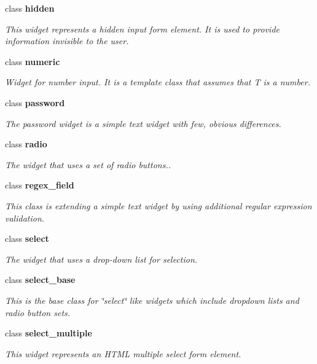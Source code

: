 \begin{DoxyCompactItemize}
class {\bf hidden}
\begin{DoxyCompactList}\small\item\em This widget represents a hidden input form element. It is used to provide information invisible to the user. \end{DoxyCompactList}\item 
class {\bf numeric}
\begin{DoxyCompactList}\small\item\em Widget for number input. It is a template class that assumes that T is a number. \end{DoxyCompactList}\item 
class {\bf password}
\begin{DoxyCompactList}\small\item\em The password widget is a simple text widget with few, obvious differences. \end{DoxyCompactList}\item 
class {\bf radio}
\begin{DoxyCompactList}\small\item\em The widget that uses a set of radio buttons.. \end{DoxyCompactList}\item 
class {\bf regex\+\_\+field}
\begin{DoxyCompactList}\small\item\em This class is extending a simple text widget by using additional regular expression validation. \end{DoxyCompactList}\item 
class {\bf select}
\begin{DoxyCompactList}\small\item\em The widget that uses a drop-\/down list for selection. \end{DoxyCompactList}\item 
class {\bf select\+\_\+base}
\begin{DoxyCompactList}\small\item\em This is the base class for \char`\"{}select\char`\"{} like widgets which include dropdown lists and radio button sets. \end{DoxyCompactList}\item 
class {\bf select\+\_\+multiple}
\begin{DoxyCompactList}\small\item\em This widget represents an H\+T\+ML multiple select form element. \end{DoxyCompactList}\item 

\end{DoxyCompactItemize}
